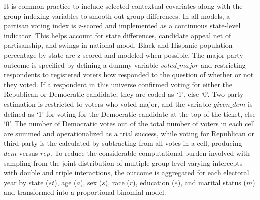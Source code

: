 It is common practice to include selected contextual covariates along with the group indexing variables to smooth out group differences. In all models, a partisan voting index is z-scored and implemented as a continuous state-level indicator. This helps account for state differences, candidate appeal net of partisanship, and swings in national mood. Black and Hispanic population percentage by state are z-scored and modeled when possible. The major-party outcome is specified by defining a dummy variable $voted\_major$ and restricting respondents to registered voters how responded to the question of whether or not they voted. If a respondent in this universe confirmed voting for either the Republican or Democratic candidate, they are coded as `1', else `0'. Two-party estimation is restricted to voters who voted major, and the variable $given\_dem$ is defined as `1' for voting for the Democratic candidate at the top of the ticket, else `0'. The number of Democratic votes out of the total number of voters in each cell are summed and operationalized as a trial success, while voting for Republican or third party is the calculated by subtracting from all votes in a cell, producing $dem$ versus $rep$. To reduce the considerable computational burden involved with sampling from the joint distribution of multiple group-level varying intercepts with double and triple interactions, the outcome is aggregated for each electoral year by state ($st$), age ($a$), sex ($s$), race ($r$), education ($e$), and marital status ($m$) and transformed into a proportional binomial model. 

